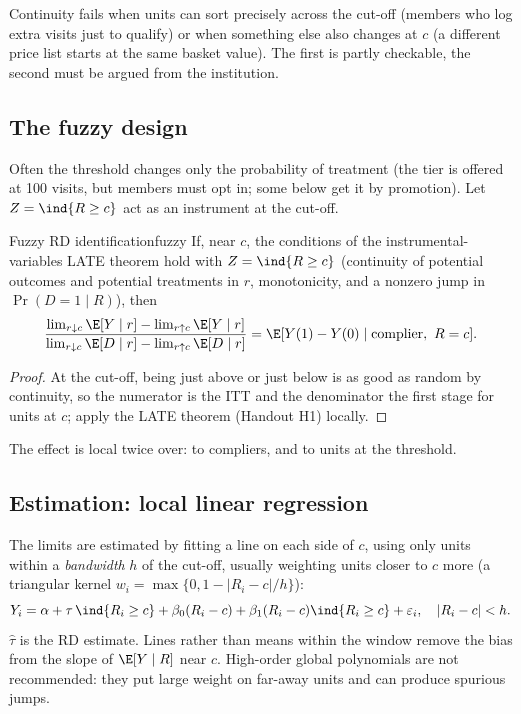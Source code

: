 \documentclass[11pt]{article}
\begin{document}
Continuity fails when units can sort precisely across the cut-off (members who log extra visits just to qualify) or when something else
also changes at $c$ (a different price list starts at the same basket value). The first is partly checkable, the second must be argued from
the institution.

\subsection{The fuzzy design}

Often the threshold changes only the probability of treatment (the tier is offered at 100 visits, but members must opt in; some below get it by
promotion). Let $Z = \ind{R \ge c}$ act as an instrument at the cut-off.

\begin{prop}{Fuzzy RD identification}{fuzzy}
If, near $c$, the conditions of the instrumental-variables LATE theorem hold with $Z = \ind{R \ge c}$ (continuity of potential outcomes and potential
treatments in $r$, monotonicity, and a nonzero jump in $\Pr(D = 1 \mid R)$), then
\[
  \frac{\lim_{r \downarrow c}\E[Y \mid r] - \lim_{r \uparrow c}\E[Y \mid r]}{\lim_{r \downarrow c}\E[D \mid r] - \lim_{r \uparrow c}\E[D \mid r]}
  = \E[Y(1) - Y(0) \mid \text{complier},\ R = c] .
\]
\end{prop}
\begin{proof}
At the cut-off, being just above or just below is as good as random by continuity, so the numerator is the ITT and the denominator the first stage
for units at $c$; apply the LATE theorem (Handout H1) locally.
\end{proof}

The effect is local twice over: to compliers, and to units at the threshold.

\subsection{Estimation: local linear regression}

The limits are estimated by fitting a line on each side of $c$, using only units within a \emph{bandwidth} $h$ of the cut-off, usually weighting
units closer to $c$ more (a triangular kernel $w_i = \max\{0, 1 - |R_i - c|/h\}$):
\[
  Y_i = \alpha + \tau\,\ind{R_i \ge c} + \beta_0(R_i - c) + \beta_1(R_i - c)\ind{R_i \ge c} + \varepsilon_i, \quad |R_i - c| < h .
\]
$\hat\tau$ is the RD estimate. Lines rather than means within the window remove the bias from the slope of $\E[Y \mid R]$ near $c$. High-order global
polynomials are not recommended: they put large weight on far-away units and can produce spurious jumps.
\end{document}
